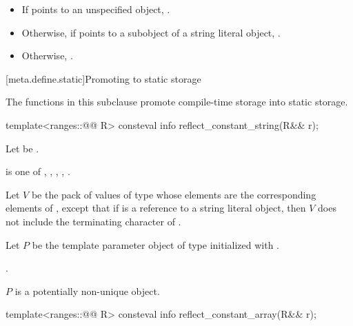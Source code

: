 \begin{itemdescr}
\pnum
\returns
\begin{itemize}
\item
  If  points to an unspecified object,
  .
\item
  Otherwise, if  points to a subobject
  of a string literal object,
  .
\item
  Otherwise, .
\end{itemize}
\end{itemdescr}

[meta.define.static]{Promoting to static storage}

\pnum
The functions in this subclause promote compile-time storage into static storage.

%
\begin{itemdecl}
template<ranges::@@ R>
  consteval info reflect_constant_string(R&& r);
\end{itemdecl}

\begin{itemdescr}
\pnum
Let  be .

\pnum
\mandates
{} is one of
,
,
,
,
.

\pnum
Let $V$ be the pack of values of type 
whose elements are the corresponding elements of ,
except that if  is a reference to a string literal object,
then $V$ does not include the terminating  character of .

\pnum
Let $P$ be the template parameter object
of type 
initialized with .

\pnum
\returns
{}.

\pnum
\begin{note}
$P$ is a potentially non-unique object.
\end{note}
\end{itemdescr}

%
\begin{itemdecl}
template<ranges::@@ R>
  consteval info reflect_constant_array(R&& r);
\end{itemdecl}


